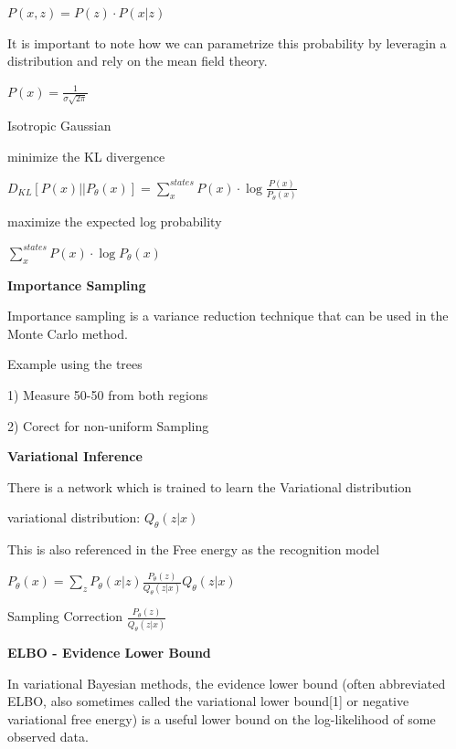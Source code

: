\documentclass{amsart}
\begin{document}
$P(x,z) = P(z) \cdot P(x|z) $

It is important to note how we can parametrize this probability by leveragin a distribution and rely on the mean field theory.

$P(x) = \frac{1}{\sigma\sqrt{2\pi}}$

\vspace{0.4 cm}

Isotropic Gaussian \vspace{0.2 cm}

minimize the KL divergence

$D_{KL}[P(x) || P_{\theta}(x)] = \sum\limits_{x}^{states}P(x)\cdot \log\frac{P(x)}{P_{\theta}(x)}$

maximize the expected log probability

$\sum\limits_{x}^{states}P(x)\cdot \log P_{\theta}(x) $

\vspace{0.4 cm}

\textbf{Importance Sampling} \vspace{0.2 cm}

Importance sampling is a variance reduction technique that can be used in the Monte Carlo method. 


Example using the trees

1) Measure 50-50 from both regions

2) Corect for non-uniform Sampling

\vspace{0.4 cm}

\textbf{Variational Inference} \vspace{0.2 cm}

There is a network which is trained to learn the Variational distribution

variational distribution: $Q_{\theta}(z|x)$

This is also referenced in the Free energy as the recognition model

$P_{\theta}(x) = \sum\limits_{z}P_{\theta}(x|z)\frac{P_{\theta}(z)}{Q_{\theta}(z|x)}Q_{\theta}(z|x) $

Sampling Correction $\frac{P_{\theta}(z)}{Q_{\theta}(z|x)}$

\vspace{0.4 cm}

\textbf{ELBO - Evidence Lower Bound} \vspace{0.2 cm}

In variational Bayesian methods, the evidence lower bound (often abbreviated ELBO, also sometimes called the variational lower bound[1] or negative variational free energy) is a useful lower bound on the log-likelihood of some observed data. \vspace{0.2 cm}
\end{document}
